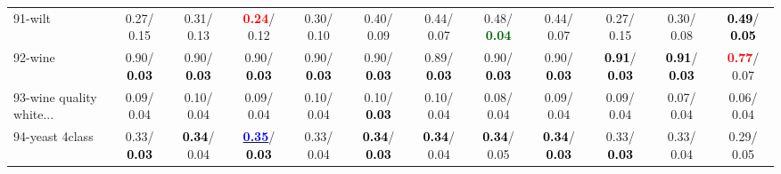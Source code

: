 \begin{table}[h]
\begin{center}
{\begin{tabular}{lc|c|c|c|c|c|c|c|c|c|c}
91-wilt &   0.27/  0.15 &   0.31/  0.13 & \textcolor{red}{\textbf{  0.24}}/  0.12 &   0.30/  0.10 &   0.40/  0.09 &   0.44/  0.07 &   0.48/\textcolor{darkgreen}{\textbf{  0.04}} &   0.44/  0.07 &   0.27/  0.15 &   0.30/  0.08 & \textcolor{black}{\textbf{  0.49}}/\textcolor{black}{\textbf{  0.05}} \\
92-wine &   0.90/\textcolor{black}{\textbf{  0.03}} &   0.90/\textcolor{black}{\textbf{  0.03}} &   0.90/\textcolor{black}{\textbf{  0.03}} &   0.90/\textcolor{black}{\textbf{  0.03}} &   0.90/\textcolor{black}{\textbf{  0.03}} &   0.89/\textcolor{black}{\textbf{  0.03}} &   0.90/\textcolor{black}{\textbf{  0.03}} &   0.90/\textcolor{black}{\textbf{  0.03}} & \textcolor{black}{\textbf{  0.91}}/\textcolor{black}{\textbf{  0.03}} & \textcolor{black}{\textbf{  0.91}}/\textcolor{black}{\textbf{  0.03}} & \textcolor{red}{\textbf{  0.77}}/  0.07 \\ \hline
93-wine quality white... &   0.09/  0.04 &   0.10/  0.04 &   0.09/  0.04 &   0.10/  0.04 &   0.10/\textcolor{black}{\textbf{  0.03}} &   0.10/  0.04 &   0.08/  0.04 &   0.09/  0.04 &   0.09/  0.04 &   0.07/  0.04 &   0.06/  0.04 \\
94-yeast 4class &   0.33/\textcolor{black}{\textbf{  0.03}} & \textcolor{black}{\textbf{  0.34}}/  0.04 & \underline{\textcolor{blue}{\textbf{  0.35}}}/\textcolor{black}{\textbf{  0.03}} &   0.33/  0.04 & \textcolor{black}{\textbf{  0.34}}/\textcolor{black}{\textbf{  0.03}} & \textcolor{black}{\textbf{  0.34}}/  0.04 & \textcolor{black}{\textbf{  0.34}}/  0.05 & \textcolor{black}{\textbf{  0.34}}/\textcolor{black}{\textbf{  0.03}} &   0.33/\textcolor{black}{\textbf{  0.03}} &   0.33/  0.04 &   0.29/  0.05 \\\end{tabular}
}\label{strats2aSVM}
\end{center}
\end{table}
